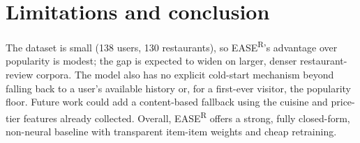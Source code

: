 \section{Limitations and conclusion}
The dataset is small (138 users, 130 restaurants), so EASE\textsuperscript{R}'s
advantage over popularity is modest; the gap is expected to widen on larger,
denser restaurant-review corpora. The model also has no explicit cold-start
mechanism beyond falling back to a user's available history or, for a
first-ever visitor, the popularity floor. Future work could add a
content-based fallback using the cuisine and price-tier features already
collected. Overall, EASE\textsuperscript{R} offers a strong, fully
closed-form, non-neural baseline with transparent item-item weights and
cheap retraining.
